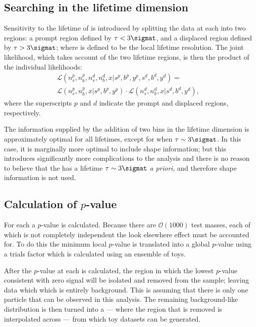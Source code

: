 \subsection{Searching in the lifetime dimension}
Sensitivity to the lifetime of \db is introduced by splitting the data at each  into two
regions: a prompt region defined by $\tau<3\sigmat$, and a displaced region defined by
$\tau>3\sigmat$; where \sigmat is defined to be the local lifetime resolution.
The joint likelihood, which takes account of the two lifetime regions, is then the product of the
individual likelihoods:
\begin{multline}
  \mathcal{L}(n^p_s, n^p_b, n^d_s, n^d_b, x | s^p, b^p, y^p, s^d, b^d, y^d) =\\
  \mathcal{L}(n^p_s, n^p_b, x | s^p, b^p, y^p) \cdot
  \mathcal{L}(n^d_s, n^d_b, x | s^d, b^d, y^d),
\end{multline}
where the superscripts $p$ and $d$ indicate the prompt and displaced regions, respectively.

The information supplied by the addition of two bins in the lifetime dimension is approximately
optimal for all \db lifetimes, except for when $\tau\sim3\sigmat$.
In this case, it is marginally more optimal to include shape information; but this introduces
significantly more complications to the analysis and there is no reason to believe that the \db has
a lifetime $\tau\sim3\sigmat$ \emph{a priori}, and therefore shape information is not used.


\subsection{Calculation of $p$-value}
For each  a $p$-value is calculated.
Because there are $\mathcal{O}(1000)$ test masses, each of which is not completely independent the
look elsewhere effect must be accounted for.
To do this the minimum local $p$-value is translated into a global $p$-value using a trials factor
which is calculated using an ensemble of toys.

After the $p$-value at each  is calculated, the region in which the lowest $p$-value
consistent with zero signal will be isolated and removed from the sample; leaving data which
which is entirely background.
This is assuming that there is only one \np particle that can be observed in this analysis.
The remaining background-like distribution is then turned into a \PDF --- where the region that is
removed is interpolated across --- from which toy datasets can be generated.








